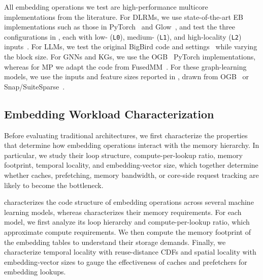 All embedding operations we test are high-performance multicore implementations from the literature. For DLRMs, we use state-of-the-art EB implementations such as those in PyTorch~\cite{paszke2019neurips} and Glow~\cite{smelyanskiy2018arxiv}, and test the three configurations in , each with low- (\texttt{L0}), medium- (\texttt{L1}), and high-locality (\texttt{L2}) inputs~\cite{gupta2020hpca,gupta2020isca}. For LLMs, we test the original BigBird code and settings~\cite{zaheer2020neurips} while varying the block size. For GNNs and KGs, we use the OGB~\cite{hu2020neurips} PyTorch implementations, whereas for MP we adapt the code from FusedMM~\cite{rahman2021ipdps}. For these graph-learning models, we use the inputs and feature sizes reported in , drawn from OGB~\cite{hu2020neurips} or Snap/SuiteSparse~\cite{leskovec2014snap,davis2011university}.

\subsection{Embedding Workload Characterization} \label{sec:embedding-workload-characterization} %



Before evaluating traditional architectures, we first characterize the properties that determine how embedding operations interact with the memory hierarchy. In particular, we study their loop structure, compute-per-lookup ratio, memory footprint, temporal locality, and embedding-vector size, which together determine whether caches, prefetching, memory bandwidth, or core-side request tracking are likely to become the bottleneck.

 characterizes the code structure of embedding operations across several machine learning models, whereas  characterizes their memory requirements. For each model, we first analyze its loop hierarchy and compute-per-lookup ratio, which approximate compute requirements. We then compute the memory footprint of the embedding tables to understand their storage demands. Finally, we characterize temporal locality with reuse-distance CDFs and spatial locality with embedding-vector sizes to gauge the effectiveness of caches and prefetchers for embedding lookups.

